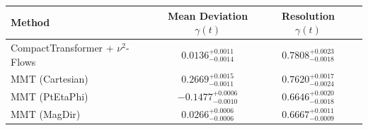     \begin{tabular}{lccc}
        \toprule
        Method & Mean Deviation $\gamma(t)$ & Resolution $\gamma(t)$ \\
        \midrule
        CompactTransformer + $\nu^2$-Flows & $0.0136^{+0.0011}_{-0.0014}$ & $0.7808^{+0.0023}_{-0.0018}$ \\
        MMT (Cartesian) & $0.2669^{+0.0015}_{-0.0011}$ & $0.7620^{+0.0017}_{-0.0024}$ \\
        MMT (PtEtaPhi) & $-0.1477^{+0.0006}_{-0.0010}$ & $0.6646^{+0.0020}_{-0.0018}$ \\
        MMT (MagDir) & $0.0266^{+0.0006}_{-0.0006}$ & $0.6667^{+0.0011}_{-0.0009}$ \\
        \bottomrule
    \end{tabular}